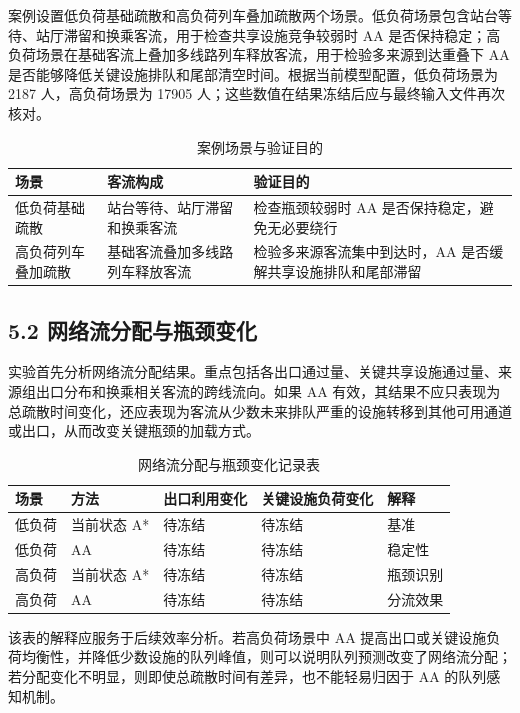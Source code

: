 \documentclass[UTF8,a4paper,12pt]{ctexart}
\begin{document}
案例设置低负荷基础疏散和高负荷列车叠加疏散两个场景。低负荷场景包含站台等待、站厅滞留和换乘客流，用于检查共享设施竞争较弱时 AA 是否保持稳定；高负荷场景在基础客流上叠加多线路列车释放客流，用于检验多来源到达重叠下 AA 是否能够降低关键设施排队和尾部清空时间。根据当前模型配置，低负荷场景为 2187 人，高负荷场景为 17905 人；这些数值在结果冻结后应与最终输入文件再次核对。

\begin{table}[htbp]
\centering
\caption{案例场景与验证目的}
\small
\begin{tabular}{p{}p{}p{}}
\toprule
场景 & 客流构成 & 验证目的 \\
\midrule
低负荷基础疏散 & 站台等待、站厅滞留和换乘客流 & 检查瓶颈较弱时 AA 是否保持稳定，避免无必要绕行 \\
高负荷列车叠加疏散 & 基础客流叠加多线路列车释放客流 & 检验多来源客流集中到达时，AA 是否缓解共享设施排队和尾部滞留 \\
\bottomrule
\end{tabular}
\end{table}

\subsection{5.2 网络流分配与瓶颈变化}

实验首先分析网络流分配结果。重点包括各出口通过量、关键共享设施通过量、来源组出口分布和换乘相关客流的跨线流向。如果 AA 有效，其结果不应只表现为总疏散时间变化，还应表现为客流从少数未来排队严重的设施转移到其他可用通道或出口，从而改变关键瓶颈的加载方式。

\begin{table}[htbp]
\centering
\caption{网络流分配与瓶颈变化记录表}
\small
\begin{tabular}{p{}p{}p{}p{}p{}}
\toprule
场景 & 方法 & 出口利用变化 & 关键设施负荷变化 & 解释 \\
\midrule
低负荷 & 当前状态 A* & 待冻结 & 待冻结 & 基准 \\
低负荷 & AA & 待冻结 & 待冻结 & 稳定性 \\
高负荷 & 当前状态 A* & 待冻结 & 待冻结 & 瓶颈识别 \\
高负荷 & AA & 待冻结 & 待冻结 & 分流效果 \\
\bottomrule
\end{tabular}
\end{table}

该表的解释应服务于后续效率分析。若高负荷场景中 AA 提高出口或关键设施负荷均衡性，并降低少数设施的队列峰值，则可以说明队列预测改变了网络流分配；若分配变化不明显，则即使总疏散时间有差异，也不能轻易归因于 AA 的队列感知机制。
\end{document}
